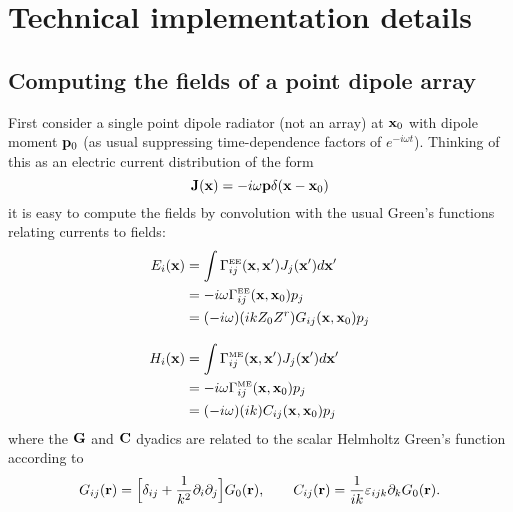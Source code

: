 \documentclass[letterpaper]{article}
\begin{document}
\newpage
\section{Technical implementation details}

\subsection*{Computing the fields of a point dipole array}


First consider a single point dipole radiator (not an array) 
at $\mathbf{x}_0$ with dipole moment $\mathbf{p}_0$ 
(as usual suppressing time-dependence factors
of $e^{-i\omega t}$). Thinking of this as an electric
current distribution of the form
$$ \mathbf{J}(\mathbf{x}) = -i\omega \mathbf{p} \delta(\mathbf{x}-\mathbf{x}_0) $$
it is easy to compute the fields by convolution with the usual
Green's functions relating currents to fields:
\begin{align*}
 E_i(\mathbf{x}) 
&= 
 \int \Gamma_{ij}^{\hbox{\tiny{EE}}}(\mathbf{x}, \mathbf{x}^\prime) J_j(\mathbf{x}^\prime) d\mathbf{x}^\prime
\\
&=-i\omega \Gamma_{ij}^{\hbox{\tiny{EE}}}(\mathbf{x}, \mathbf{x}_0) p_j
\\
&=(-i\omega)(ikZ_0Z^r) G_{ij}(\mathbf{x}, \mathbf{x}_0) p_j
\\[8pt]
H_i(\mathbf{x}) 
 &=
\int \Gamma_{ij}^{\hbox{\tiny{ME}}}(\mathbf{x}, \mathbf{x}^\prime) J_j(\mathbf{x}^\prime) d\mathbf{x}^\prime
\\
&=-i\omega \Gamma_{ij}^{\hbox{\tiny{ME}}}(\mathbf{x}, \mathbf{x}_0) p_j
\\
&=(-i\omega)(ik) C_{ij}(\mathbf{x}, \mathbf{x}_0) p_j
\end{align*}
where the $\mathbf{G}$ and $\mathbf{C}$ dyadics are related to the
scalar Helmholtz Green's function according to
$$ G_{ij}(\mathbf{r})
   = \Big[ \delta_{ij} +\frac{1}{k^2} \partial_i \partial_j \Big] G_0(\mathbf{r}),
\qquad
   C_{ij}(\mathbf{r})
   = \frac{1}{ik}\varepsilon_{ijk} \partial_k G_0(\mathbf{r}).
$$
\end{document}

